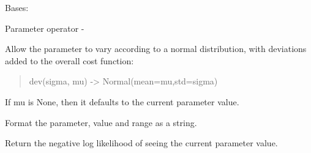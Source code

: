 \documentclass[letterpaper,10pt,english]{sphinxmanual}
\begin{document}
\begin{fulllineitems}
\label{api/mystic.parameter:refl1d.mystic.parameter.OperatorSub}
Bases: {\hyperref[api/mystic.parameter:refl1d.mystic.parameter.BaseParameter]{}}

Parameter operator -

\begin{fulllineitems}
\label{api/mystic.parameter:refl1d.mystic.parameter.OperatorSub.dev}
Allow the parameter to vary according to a normal distribution, with
deviations added to the overall cost function:
\begin{quote}

dev(sigma, mu) -\textgreater{} Normal(mean=mu,std=sigma)
\end{quote}

If mu is None, then it defaults to the current parameter value.

\end{fulllineitems}


\begin{fulllineitems}
\label{api/mystic.parameter:refl1d.mystic.parameter.OperatorSub.dvalue}
\end{fulllineitems}


\begin{fulllineitems}
\label{api/mystic.parameter:refl1d.mystic.parameter.OperatorSub.format}
Format the parameter, value and range as a string.

\end{fulllineitems}


\begin{fulllineitems}
\label{api/mystic.parameter:refl1d.mystic.parameter.OperatorSub.nllf}
Return the negative log likelihood of seeing the current parameter value.

\end{fulllineitems}


\end{fulllineitems}
\end{document}
